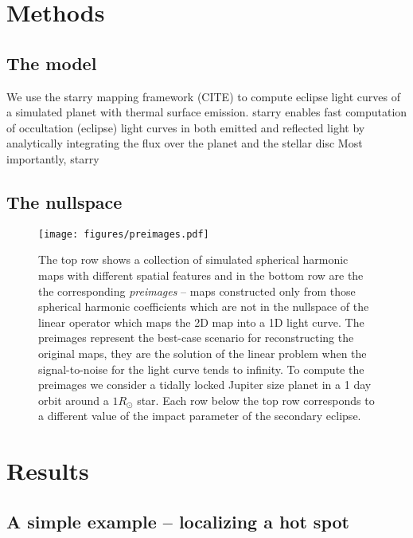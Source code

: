 \documentclass[modern]{aastex631}
\begin{document}
\section{Methods}
\label{sec:methods}

\subsection{The model}
\label{ssec:model}

We use the \textsf{starry} mapping framework (CITE) to compute eclipse light curves of a simulated planet with thermal surface emission.
\textsf{starry} enables fast computation of occultation (eclipse) light curves in both emitted and reflected light by analytically integrating the flux over the planet and the stellar disc 
Most importantly, \textsf{starry} 

\subsection{The nullspace}
\label{ssec:nullspace}

\begin{figure}[t!]
    \begin{centering}
    \texttt{[image: figures/preimages.pdf]}
    \caption{
        The top row shows a collection of simulated spherical harmonic maps with different spatial 
        features and in the bottom row are the the corresponding \emph{preimages} -- maps 
        constructed only from those spherical harmonic
        coefficients which are not in the nullspace of the linear operator which 
        maps the 2D map into a 1D light curve. 
        The preimages represent the best-case scenario for reconstructing the original maps, they are the solution of the linear problem
        when the signal-to-noise for the light curve tends to infinity.
        To compute the preimages we consider a tidally locked Jupiter size planet in a 1 day orbit around a $1R_\odot$ star.
        Each row below the top row corresponds to a different value of the impact parameter of the secondary eclipse.
    }
    \label{fig:preimages}
    \end{centering}
\end{figure}

\section{Results}
\label{sec:results}


\subsection{A simple example -- localizing a hot spot}
\label{ssec:localizing_spot}
\end{document}
